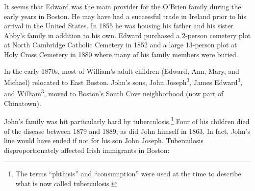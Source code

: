 It seems that Edward was the main provider for the O'Brien family during the early years in Boston. He may have had a successful trade in Ireland prior to his arrival in the United States. In 1855 he was housing his father and his sister Abby's family in addition to his own.\cite{Census1855William:1} Edward purchased a 2-person cemetery plot at North Cambridge Catholic Cemetery in 1852\cite{CarolGordon:1} and a large 13-person plot at Holy Cross Cemetery in 1880\cite{HolyCrossPlotEdward:1} where many of his family members were buried.

In the early 1870s, most of William's adult children (Edward, Ann, Mary, and Michael) relocated to East Boston. John's sons, John Joseph\textsuperscript{3}, James Edward\textsuperscript{3}, and William\textsuperscript{3}, moved to Boston's South Cove neighborhood (now part of Chinatown).\cite{1870sAddresses}

John's family was hit particularly hard by tuberculosis.\footnote{The terms ``phthisis'' and ``consumption'' were used at the time to describe what is now called tuberculosis.\cite{TuberculosisHistory}} Four of his children died of the disease between 1879 and 1889, as did John himself in 1863.\cite{John2OBrienDeath:1} In fact, John's line would have ended if not for his son John Joseph. Tuberculosis disproportionately affected Irish immigrants in Boston:

